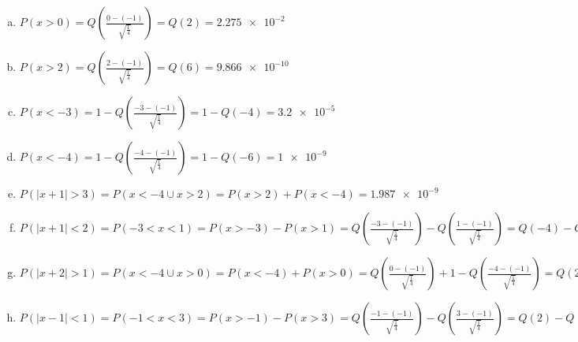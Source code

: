 \documentclass[12pt]{article}
\newenvironment{problem}[2][Problem]{\begin{trivlist}
\item[\hskip \labelsep {\bfseries #1}\hskip \labelsep {\bfseries #2.}]
  \vspace{1 cm}
}{\end{trivlist}}
\begin{document}
\begin{problem}{3.23} %
\item
  \begin{enumerate}[a.]
    \item %
      $P(x>0) = Q\left(\frac{0-(-1)}{\sqrt{\frac{1}{4}}}\right) = Q(2) = \num{2.275e-2}$
    \item %
      $P(x>2) = Q\left(\frac{2-(-1)}{\sqrt{\frac{1}{4}}}\right) = Q(6) = \num{9.866e-10}$
    \item %
      $P(x<-3) = 1 -Q\left(\frac{-3-(-1)}{\sqrt{\frac{1}{4}}}\right) = 1-Q(-4) = \num{3.2e-5}$
    \item %
      $P(x<-4) = 1 -Q\left(\frac{-4-(-1)}{\sqrt{\frac{1}{4}}}\right) = 1-Q(-6) = \num{1e-9}$
    \item %
      $P(|x+1|>3) = P(x<-4 \cup x>2) = P(x>2) + P(x<-4) = \num{1.987e-9}$
    \item %
      $P(|x+1|<2) = P(-3<x<1) = P(x>-3) - P(x>1) = Q\left(\frac{-3-(-1)}{\sqrt{\frac{1}{4}}}\right)
      - Q\left(\frac{1-(-1)}{\sqrt{\frac{1}{4}}}\right) = Q(-4)-Q(4) = 1-2Q(4) = .9999$
    \item %
      $P(|x+2|>1) = P(x<-4 \cup x>0) = P(x<-4) + P(x>0) = Q\left(\frac{0-(-1)}{\sqrt{\frac{1}{4}}}\right)
      + 1 - Q\left(\frac{-4-(-1)}{\sqrt{\frac{1}{4}}}\right) = Q(2) + (1 - Q(-6)) = \num{2.275e-2}$
    \item %
      $P(|x-1|<1) = P(-1<x<3) = P(x>-1) - P(x>3) = Q\left(\frac{-1-(-1)}{\sqrt{\frac{1}{4}}}\right)
      - Q\left(\frac{3-(-1)}{\sqrt{\frac{1}{4}}}\right) = Q(2)-Q(8) = \num{2.275e-2}$
  \end{enumerate}
\end{problem}

\begin{problem}{3.25} %
\item
\end{problem}

\begin{problem}{3.27} %
\item
\end{problem}

\begin{problem}{3.29} %
\item
\end{problem}

\begin{problem}{3.31} %
\item
\end{problem}

\begin{problem}{3.33} %
\item
\end{problem}
\end{document}
